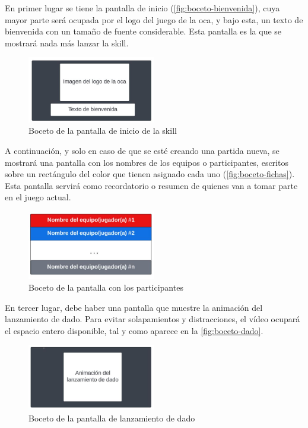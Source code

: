 En primer lugar se tiene la pantalla de inicio (\autoref{fig:boceto-bienvenida}), cuya mayor parte será ocupada por el logo del juego de la oca, y bajo esta, un texto de bienvenida con un tamaño de fuente considerable. Esta pantalla es la que se mostrará nada más lanzar la skill.

\begin{figure}[H]
    \centering
    \includegraphics[width=0.5\textwidth]{imgs/boceto-bienvenida.JPG}
    \caption{Boceto de la pantalla de inicio de la skill}
    \label{fig:boceto-bienvenida}
\end{figure}

A continuación, y solo en caso de que se esté creando una partida nueva, se mostrará una pantalla con los nombres de los equipos o participantes, escritos sobre un rectángulo del color que tienen asignado cada uno (\autoref{fig:boceto-fichas}). Esta pantalla servirá como recordatorio o resumen de quienes van a tomar parte en el juego actual.

\begin{figure}[H]
    \centering
    \includegraphics[width=0.5\textwidth]{imgs/boceto-fichas.JPG}
    \caption{Boceto de la pantalla con los participantes}
    \label{fig:boceto-fichas}
\end{figure}

En tercer lugar, debe haber una pantalla que muestre la animación del lanzamiento de dado. Para evitar solapamientos y distracciones, el vídeo ocupará el espacio entero disponible, tal y como aparece en la \autoref{fig:boceto-dado}.

\begin{figure}[H]
	\centering
	\includegraphics[width=0.5\textwidth]{imgs/boceto-dado.JPG}
	\caption{Boceto de la pantalla de lanzamiento de dado}
	\label{fig:boceto-dado}
\end{figure}

